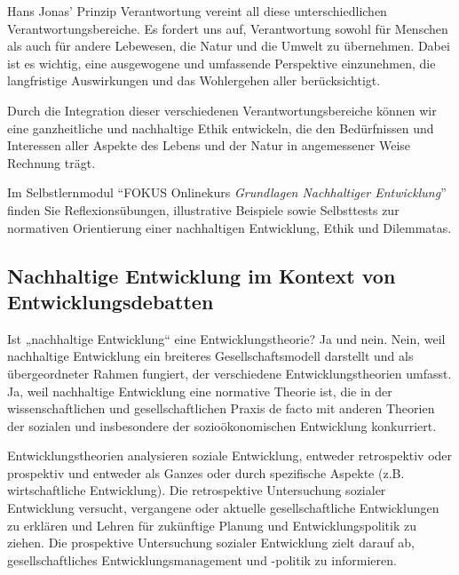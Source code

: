 \documentclass[
  letterpaper,
  DIV=11,
  numbers=noendperiod]{scrartcl}
\begin{document}
Hans Jonas' Prinzip Verantwortung vereint all diese unterschiedlichen
Verantwortungsbereiche. Es fordert uns auf, Verantwortung sowohl für
Menschen als auch für andere Lebewesen, die Natur und die Umwelt zu
übernehmen. Dabei ist es wichtig, eine ausgewogene und umfassende
Perspektive einzunehmen, die langfristige Auswirkungen und das
Wohlergehen aller berücksichtigt.

Durch die Integration dieser verschiedenen Verantwortungsbereiche können
wir eine ganzheitliche und nachhaltige Ethik entwickeln, die den
Bedürfnissen und Interessen aller Aspekte des Lebens und der Natur in
angemessener Weise Rechnung trägt.

\begin{tcolorbox}[enhanced jigsaw, opacitybacktitle=0.6, breakable, left=2mm, colback=white, leftrule=.75mm, colbacktitle=quarto-callout-caution-color!10!white, bottomrule=.15mm, toprule=.15mm, titlerule=0mm, title=\textcolor{quarto-callout-caution-color}{\faFire}\hspace{0.5em}{(Reflexions)übungen und Beispiele}, colframe=quarto-callout-caution-color-frame, bottomtitle=1mm, opacityback=0, arc=.35mm, toptitle=1mm, rightrule=.15mm, coltitle=black]

Im Selbstlernmodul ``FOKUS Onlinekurs \emph{Grundlagen Nachhaltiger
Entwicklung}'' finden Sie Reflexionsübungen, illustrative Beispiele
sowie Selbsttests zur normativen Orientierung einer nachhaltigen
Entwicklung, Ethik und Dilemmatas.

\end{tcolorbox}

\subsection{Nachhaltige Entwicklung im Kontext von
Entwicklungsdebatten}\label{nachhaltige-entwicklung-im-kontext-von-entwicklungsdebatten}

Ist „nachhaltige Entwicklung`` eine Entwicklungstheorie? Ja und nein.
Nein, weil nachhaltige Entwicklung ein breiteres Gesellschaftsmodell
darstellt und als übergeordneter Rahmen fungiert, der verschiedene
Entwicklungstheorien umfasst. Ja, weil nachhaltige Entwicklung eine
normative Theorie ist, die in der wissenschaftlichen und
gesellschaftlichen Praxis de facto mit anderen Theorien der sozialen und
insbesondere der sozioökonomischen Entwicklung konkurriert.

Entwicklungstheorien analysieren soziale Entwicklung, entweder
retrospektiv oder prospektiv und entweder als Ganzes oder durch
spezifische Aspekte (z.B. wirtschaftliche Entwicklung). Die
retrospektive Untersuchung sozialer Entwicklung versucht, vergangene
oder aktuelle gesellschaftliche Entwicklungen zu erklären und Lehren für
zukünftige Planung und Entwicklungspolitik zu ziehen. Die prospektive
Untersuchung sozialer Entwicklung zielt darauf ab, gesellschaftliches
Entwicklungsmanagement und -politik zu informieren.
\end{document}
